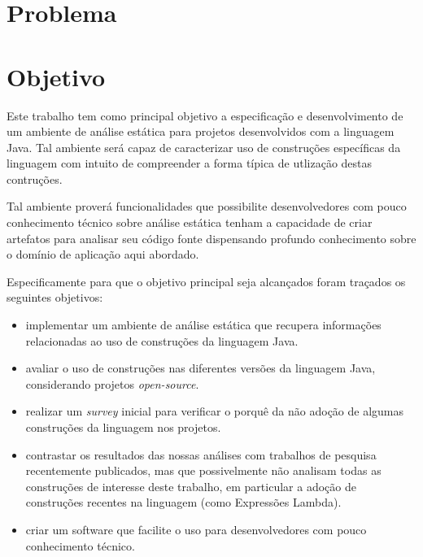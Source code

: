 \section{Problema}

\section{Objetivo}
	Este trabalho tem como principal objetivo a especificação e desenvolvimento de um ambiente de análise estática para projetos desenvolvidos com a linguagem Java. Tal ambiente será capaz de caracterizar uso de construções específicas da linguagem com intuito de compreender a forma típica de utlização destas contruções. 
	
	Tal ambiente proverá funcionalidades que possibilite desenvolvedores com pouco conhecimento técnico sobre análise estática tenham a capacidade de criar artefatos para analisar seu código fonte dispensando profundo conhecimento sobre o domínio de aplicação aqui abordado.
	
	Especificamente para que o objetivo principal seja alcançados foram traçados os seguintes objetivos:


	
	\begin{itemize}
	  \item implementar um ambiente de análise estática que recupera informações relacionadas ao uso  de construções da linguagem Java. 
	  
	  \item avaliar o uso de construções nas diferentes versões da linguagem Java, considerando  projetos \textit{open-source}. 
	  
	  \item realizar um \textit{survey} inicial para verificar o porqu\^{e} da não adoção de algumas construções  da linguagem nos projetos. 
	  
	  \item contrastar os resultados das nossas análises com trabalhos de pesquisa recentemente publicados, mas que possivelmente não analisam todas as construções de interesse deste trabalho, em particular 
	  a adoção de construções recentes na linguagem (como Expressões Lambda). 
	  
	  \item criar um software que facilite o uso para desenvolvedores com pouco conhecimento técnico.
	\end{itemize}


